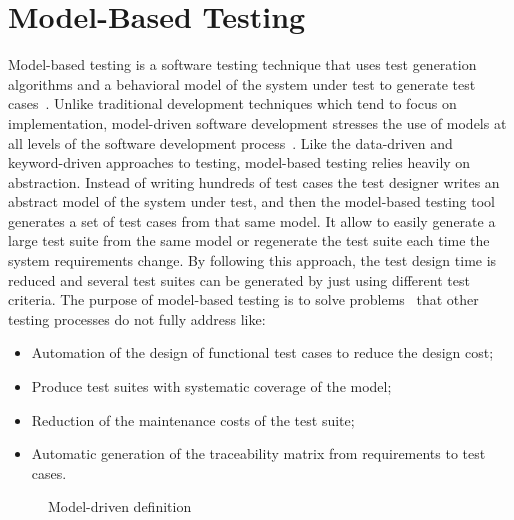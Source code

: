 \section{Model-Based Testing}

Model-based testing is a software testing technique that uses test generation algorithms and a behavioral model of the system under test to generate test cases~\cite{1200168}. Unlike traditional development techniques which tend to focus on implementation, model-driven software development
stresses the use of models at all levels of the software
development process~\cite{5381477}. Like the data-driven and keyword-driven approaches to testing, model-based testing relies heavily on abstraction. Instead of writing hundreds of test cases the test designer writes an abstract model of the system under test, and then the model-based testing tool generates a set of test cases from that same model. It allow to easily generate a large test suite from the same model or regenerate the test suite each time the system requirements change. By following this approach, the test design time is reduced and several test suites can be generated by just using different test criteria. The purpose of model-based testing is to solve problems~\cite{1200168} that other testing processes do not fully address like:
\begin{itemize}
\item Automation of the design of functional test cases to reduce the design cost;
\item Produce test suites with systematic coverage of the model;
\item Reduction of the maintenance costs of the test suite;
\item Automatic generation of the traceability matrix from requirements to test cases.
\end{itemize}

\begin{figure}[!ht]
\centering
{}
\caption{Model-driven definition} \label{fig:f3}
\end{figure}


